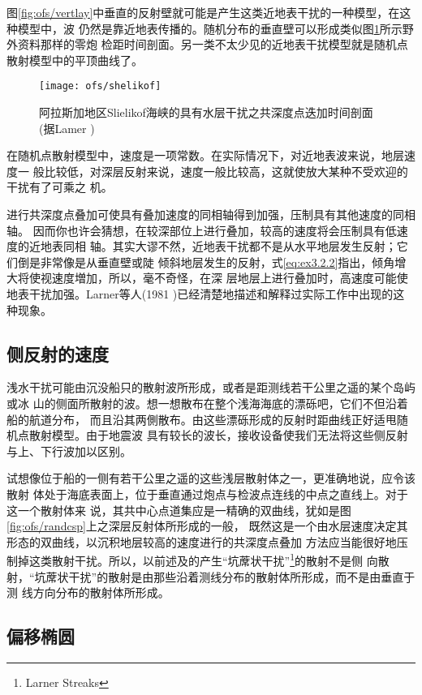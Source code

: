 图\ref{fig:ofs/vertlay}中垂直的反射壁就可能是产生这类近地表干扰的一种模型，在这种模型中，波
仍然是靠近地表传播的。随机分布的垂直壁可以形成类似图\ref{fig:ofs/shelikof}所示野外资料那样的零炮
检距时间剖面。另一类不太少见的近地表干扰模型就是随机点散射模型中的平顶曲线了。

\begin{figure}[H]
\centering
\texttt{[image: ofs/shelikof]}
\caption[shelikof]{阿拉斯加地区Slielikof海峡的具有水层干扰之共深度点迭加时间剖面(据Lamer
) }
\label{fig:ofs/shelikof}
\end{figure}

在随机点散射模型中，速度是一项常数。在实际情况下，对近地表波来说，地层速度一
般比较低，对深层反射来说，速度一般比较高，这就使放大某种不受欢迎的干扰有了可乘之
机。

进行共深度点叠加可使具有叠加速度的同相轴得到加强，压制具有其他速度的同相轴。
因而你也许会猜想，在较深部位上进行叠加，较高的速度将会压制具有低速度的近地表同相
轴。其实大谬不然，近地表干扰都不是从水平地层发生反射；它们倒是非常像是从垂直壁或陡
倾斜地层发生的反射，式\ref{eq:ex3.2.2}指出，倾角增大将使视速度増加，所以，毫不奇怪，在深
层地层上进行叠加时，高速度可能使地表干扰加强。Larner等人(1981
)已经清楚地描述和解释过实际工作中出现的这种现象。

\subsection{侧反射的速度}
\label{sec:3.2.7}

浅水干扰可能由沉没船只的散射波所形成，或者是距测线若干公里之遥的某个岛屿或冰
山的侧面所散射的波。想一想散布在整个浅海海底的漂砾吧，它们不但沿着船的航道分布，
而且沿其两側散布。由这些漂砾形成的反射时距曲线正好适甩随机点散射模型。由于地震波
具有较长的波长，接收设备使我们无法将这些侧反射与上、下行波加以区别。

试想像位于船的一侧有若干公里之遥的这些浅层散射体之一，更准确地说，应令该散射
体处于海底表面上，位于垂直通过炮点与检波点连线的中点之直线上。对于这一个散射体来
说，其共中心点道集应是一精确的双曲线，犹如是图\ref{fig:ofs/randcsp}上之深层反射体所形成的一般，
既然这是一个由水层速度决定其形态的双曲线，以沉积地层较高的速度进行的共深度点叠加
方法应当能很好地压制掉这类散射干扰。所以，以前述及的产生“坑蓆状干扰”\footnote{Larner Streaks}的散射不是侧
向散射，“坑蓆状干扰”的散射是由那些沿着测线分布的散射体所形成，而不是由垂直于测
线方向分布的散射体所形成。

\subsection{偏移椭圆}
\label{sec:3.2.8}

